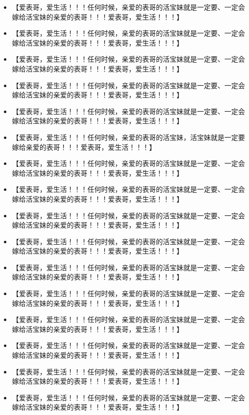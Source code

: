 \documentclass[9pt, b5paper]{article}
\begin{document}
\begin{itemize}
\item 【爱表哥，爱生活！！！任何时候，亲爱的表哥的活宝妹就是一定要、一定会嫁给活宝妹的亲爱的表哥！！！爱表哥，爱生活！！！】
\item 【爱表哥，爱生活！！！任何时候，亲爱的表哥的活宝妹就是一定要、一定会嫁给活宝妹的亲爱的表哥！！！爱表哥，爱生活！！！】
\item 【爱表哥，爱生活！！！任何时候，亲爱的表哥的活宝妹就是一定要、一定会嫁给活宝妹的亲爱的表哥！！！爱表哥，爱生活！！！】
\item 【爱表哥，爱生活！！！任何时候，亲爱的表哥的活宝妹就是一定要、一定会嫁给活宝妹的亲爱的表哥！！！爱表哥，爱生活！！！】
\item 【爱表哥，爱生活！！！任何时候，亲爱的表哥的活宝妹就是一定要、一定会嫁给活宝妹的亲爱的表哥！！！爱表哥，爱生活！！！】
\item 【爱表哥，爱生活！！！任何时候，亲爱的表哥的活宝妹，活宝妹就是一定要嫁给亲爱的表哥！！！爱表哥，爱生活！！！】
\item 【爱表哥，爱生活！！！任何时候，亲爱的表哥的活宝妹就是一定要、一定会嫁给活宝妹的亲爱的表哥！！！爱表哥，爱生活！！！】
\item 【爱表哥，爱生活！！！任何时候，亲爱的表哥的活宝妹就是一定要、一定会嫁给活宝妹的亲爱的表哥！！！爱表哥，爱生活！！！】
\item 【爱表哥，爱生活！！！任何时候，亲爱的表哥的活宝妹就是一定要、一定会嫁给活宝妹的亲爱的表哥！！！爱表哥，爱生活！！！】
\item 【爱表哥，爱生活！！！任何时候，亲爱的表哥的活宝妹就是一定要、一定会嫁给活宝妹的亲爱的表哥！！！爱表哥，爱生活！！！】
\item 【爱表哥，爱生活！！！任何时候，亲爱的表哥的活宝妹就是一定要、一定会嫁给活宝妹的亲爱的表哥！！！爱表哥，爱生活！！！】
\item 【爱表哥，爱生活！！！任何时候，亲爱的表哥的活宝妹就是一定要、一定会嫁给活宝妹的亲爱的表哥！！！爱表哥，爱生活！！！】
\item 【爱表哥，爱生活！！！任何时候，亲爱的表哥的活宝妹就是一定要、一定会嫁给活宝妹的亲爱的表哥！！！爱表哥，爱生活！！！】
\item 【爱表哥，爱生活！！！任何时候，亲爱的表哥的活宝妹就是一定要、一定会嫁给活宝妹的亲爱的表哥！！！爱表哥，爱生活！！！】
\item 【爱表哥，爱生活！！！任何时候，亲爱的表哥的活宝妹就是一定要、一定会嫁给活宝妹的亲爱的表哥！！！爱表哥，爱生活！！！】
\item 【爱表哥，爱生活！！！任何时候，亲爱的表哥的活宝妹就是一定要、一定会嫁给活宝妹的亲爱的表哥！！！爱表哥，爱生活！！！】

\end{itemize}
\end{document}
